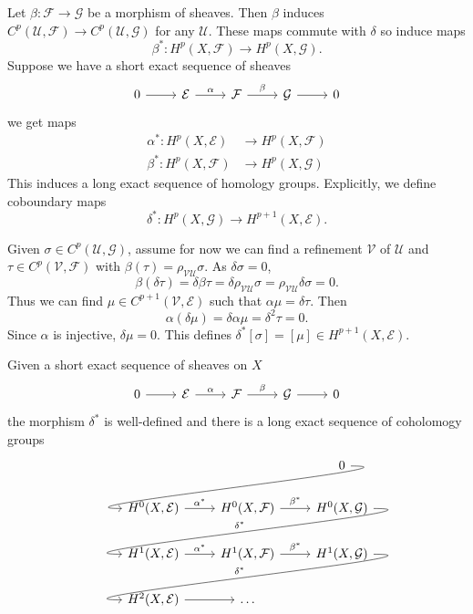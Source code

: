 \documentclass[a4paper]{article}
\begin{document}
Let \(\beta: \mathcal F \to \mathcal G\) be a morphism of sheaves. Then \(\beta\) induces \(C^p(\mathcal U, \mathcal F) \to C^p(\mathcal U, \mathcal G)\) for any \(\mathcal U\). These maps commute with \(\delta\) so induce maps
\[
  \beta^*: H^p(X, \mathcal F) \to H^p(X, \mathcal G).
\]
Suppose we have a short exact sequence of sheaves
\[
  \begin{tikzcd}
    0 \ar[r] & \mathcal E \ar[r, "\alpha"] & \mathcal F \ar[r, "\beta"] & \mathcal G \ar[r] & 0
  \end{tikzcd}
\]
we get maps
\begin{align*}
  \alpha^*: H^p(X, \mathcal E) &\to H^p(X, \mathcal F) \\
  \beta^*: H^p(X, \mathcal F) &\to H^p(X, \mathcal G)
\end{align*}
This induces a long exact sequence of homology groups. Explicitly, we define coboundary maps
\[
  \delta^*: H^p(X, \mathcal G) \to H^{p + 1}(X, \mathcal E).
\]

Given \(\sigma \in C^p(\mathcal U, \mathcal G)\), assume for now we can find a refinement \(\mathcal V\) of \(\mathcal U\) and \(\tau \in C^p(\mathcal V, \mathcal F)\) with \(\beta(\tau) = \rho_{\mathcal V \mathcal U} \sigma\). As \(\delta \sigma = 0\),
\[
  \beta(\delta \tau)
  = \delta \beta \tau
  = \delta \rho_{\mathcal V \mathcal U} \sigma
  = \rho_{\mathcal V \mathcal U} \delta \sigma
  = 0.
\]
Thus we can find \(\mu \in C^{p + 1}(\mathcal V, \mathcal E)\) such that \(\alpha \mu = \delta \tau\). Then
\[
  \alpha(\delta \mu) = \delta \alpha \mu = \delta^2 \tau = 0.
\]
Since \(\alpha\) is injective, \(\delta \mu = 0\). This defines \(\delta^*[\sigma] = [\mu] \in H^{p + 1}(X, \mathcal E)\).

\begin{theorem}
  Given a short exact sequence of sheaves on \(X\)
  \[
    \begin{tikzcd}
      0 \ar[r] & \mathcal E \ar[r, "\alpha"] & \mathcal F \ar[r, "\beta"] & \mathcal G \ar[r] & 0
    \end{tikzcd}
  \]
  the morphism \(\delta^*\) is well-defined and there is a long exact sequence of coholomogy groups
  \[
    \begin{tikzcd}
      & & 0 \ar[dll, out=0, in=180] \\
      H^0(X, \mathcal E) \ar[r, "\alpha^*"] & H^0(X, \mathcal F) \ar[r, "\beta^*"] & H^0(X, \mathcal G) \ar[dll, "\delta^*"', out=0, in=180, overlay] \\
      H^1(X, \mathcal E) \ar[r, "\alpha^*"] & H^1(X, \mathcal F) \ar[r, "\beta^*"] & H^1(X, \mathcal G) \ar[dll, "\delta^*"', out=0, in=180, overlay] \\
      H^2(X, \mathcal E) \ar[r] & \dots
    \end{tikzcd}
  \]
\end{theorem}
\end{document}
